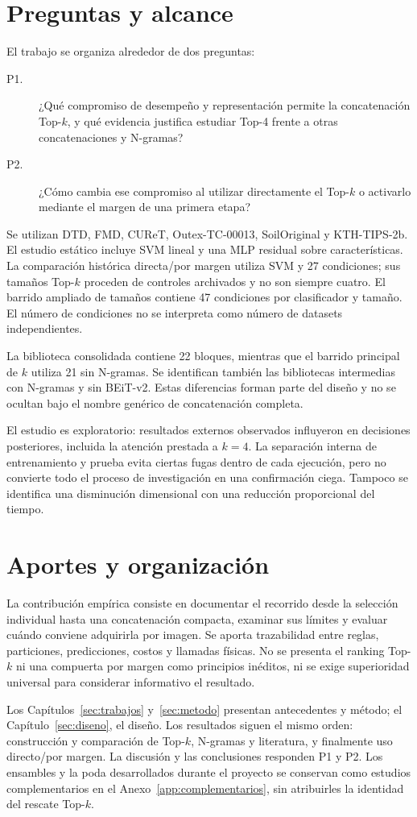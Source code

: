 \section{Preguntas y alcance}
El trabajo se organiza alrededor de dos preguntas:
\begin{description}
\item[P1.] ¿Qué compromiso de desempeño y representación permite la concatenación Top-\(k\), y qué evidencia justifica estudiar Top-4 frente a otras concatenaciones y N-gramas?
\item[P2.] ¿Cómo cambia ese compromiso al utilizar directamente el Top-\(k\) o activarlo mediante el margen de una primera etapa?
\end{description}

Se utilizan DTD, FMD, CUReT, Outex-TC-00013, SoilOriginal y KTH-TIPS-2b. El estudio estático incluye SVM lineal y una MLP residual sobre características. La comparación histórica directa/por margen utiliza SVM y 27 condiciones; sus tamaños Top-\(k\) proceden de controles archivados y no son siempre cuatro. El barrido ampliado de tamaños contiene 47 condiciones por clasificador y tamaño. El número de condiciones no se interpreta como número de datasets independientes.

La biblioteca consolidada contiene 22 bloques, mientras que el barrido principal de \(k\) utiliza 21 sin N-gramas. Se identifican también las bibliotecas intermedias con N-gramas y sin BEiT-v2. Estas diferencias forman parte del diseño y no se ocultan bajo el nombre genérico de concatenación completa.

El estudio es exploratorio: resultados externos observados influyeron en decisiones posteriores, incluida la atención prestada a \(k=4\). La separación interna de entrenamiento y prueba evita ciertas fugas dentro de cada ejecución, pero no convierte todo el proceso de investigación en una confirmación ciega. Tampoco se identifica una disminución dimensional con una reducción proporcional del tiempo.

\section{Aportes y organización}
La contribución empírica consiste en documentar el recorrido desde la selección individual hasta una concatenación compacta, examinar sus límites y evaluar cuándo conviene adquirirla por imagen. Se aporta trazabilidad entre reglas, particiones, predicciones, costos y llamadas físicas. No se presenta el ranking Top-\(k\) ni una compuerta por margen como principios inéditos, ni se exige superioridad universal para considerar informativo el resultado.

Los Capítulos~\ref{sec:trabajos} y~\ref{sec:metodo} presentan antecedentes y método; el Capítulo~\ref{sec:diseno}, el diseño. Los resultados siguen el mismo orden: construcción y comparación de Top-\(k\), N-gramas y literatura, y finalmente uso directo/por margen. La discusión y las conclusiones responden P1 y P2. Los ensambles y la poda desarrollados durante el proyecto se conservan como estudios complementarios en el Anexo~\ref{app:complementarios}, sin atribuirles la identidad del rescate Top-\(k\).

